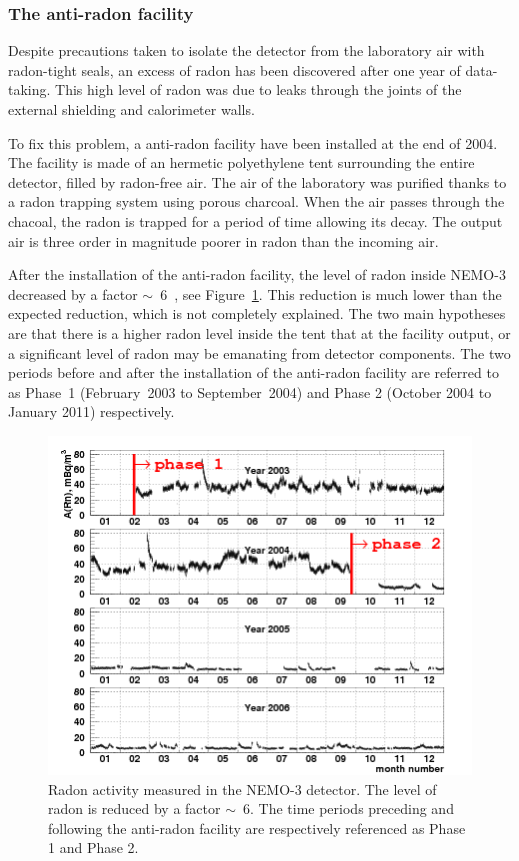 \documentclass[main.tex]{subfiles}
\begin{document}
\subsubsection{The anti-radon facility}


\NI Despite precautions taken to isolate the detector from the laboratory air with radon-tight seals, an excess of radon has been discovered after one year of data-taking. This high level of radon was due to leaks through the joints of the external shielding and calorimeter walls.


\bigskip


\NI To fix this problem, a anti-radon facility have been installed at the end of 2004. The facility is made of an hermetic polyethylene tent surrounding the entire detector, filled by radon-free air. The air of the laboratory was purified thanks to a radon trapping system using porous charcoal. When the air passes through the chacoal, the radon is trapped for a period of time allowing its decay. The output air is three order in magnitude poorer in radon than the incoming air.


\bigskip


\NI After the installation of the anti-radon facility, the level of radon inside NEMO-3 decreased by a factor $\sim$~6~\cite{NEMO3-BKG}, see Figure~\ref{RadonByTime}. This reduction is much lower than the expected reduction, which is not completely explained. The two main hypotheses are that there is a higher radon level inside the tent that at the facility output, or a significant level of radon may be emanating from detector components. The two periods before and after the installation of the anti-radon facility are referred to as Phase~1 (February~2003 to September~2004) and Phase 2 (October 2004 to January 2011) respectively.

 
\begin{figure}[h!]
\begin{center}
\includegraphics[scale=0.75]{pictures/Chap3/rn_bytime.png}
\caption{Radon activity measured in the NEMO-3 detector. The level of radon is reduced by a factor $\sim$~6. The time periods preceding and following the anti-radon facility are respectively referenced as Phase 1 and Phase 2.}
\label{RadonByTime}
\end{center}
\end{figure}
\end{document}
